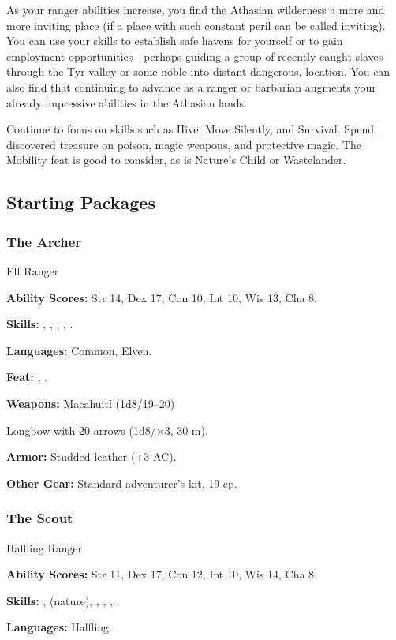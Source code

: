 As your ranger abilities increase, you find the Athasian wilderness a more and more inviting place (if a place with such constant peril can be called inviting). You can use your skills to establish safe havens for yourself or to gain employment opportunities---perhaps guiding a group of recently caught slaves through the Tyr valley or some noble into distant dangerous, location. You can also find that continuing to advance as a ranger or barbarian augments your already impressive abilities in the Athasian lands.

Continue to focus on skills such as Hive, Move Silently, and Survival. Spend discovered treasure on poison, magic weapons, and protective magic. The Mobility feat is good to consider, as is Nature's Child or Wastelander.

\subsection{Starting Packages}
\subsubsection{The Archer}
Elf Ranger

\textbf{Ability Scores:} Str 14, Dex 17, Con 10, Int 10, Wis 13, Cha 8.

\textbf{Skills:} , , , , .

\textbf{Languages:} Common, Elven.

\textbf{Feat:} , .

\textbf{Weapons:} Macahuitl (1d8/19--20)

Longbow with 20 arrows (1d8/$\times$3, 30 m).

\textbf{Armor:} Studded leather (+3 AC).

\textbf{Other Gear:} Standard adventurer's kit, 19 cp.

\subsubsection{The Scout}
Halfling Ranger

\textbf{Ability Scores:} Str 11, Dex 17, Con 12, Int 10, Wis 14, Cha 8.

\textbf{Skills:} ,  (nature), , , , .

\textbf{Languages:} Halfling.

